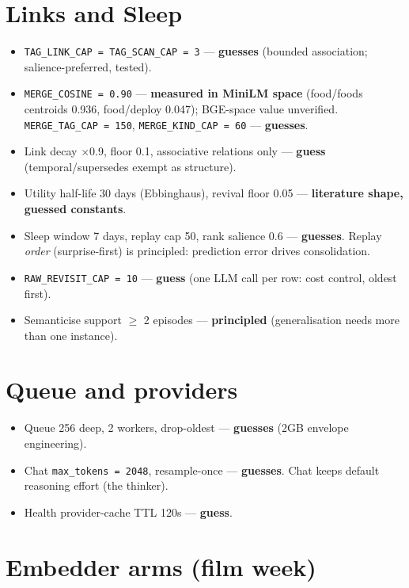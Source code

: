 \section{Links and Sleep}

\begin{itemize}
\item \texttt{TAG\_LINK\_CAP = TAG\_SCAN\_CAP = 3} --- \textbf{guesses}
(bounded association; salience-preferred, tested).
\item \texttt{MERGE\_COSINE = 0.90} --- \textbf{measured in MiniLM
space} (food/foods centroids 0.936, food/deploy 0.047); BGE-space value
unverified. \texttt{MERGE\_TAG\_CAP = 150},
\texttt{MERGE\_KIND\_CAP = 60} --- \textbf{guesses}.
\item Link decay $\times$0.9, floor 0.1, associative relations only
--- \textbf{guess} (temporal/supersedes exempt as structure).
\item Utility half-life 30 days (Ebbinghaus), revival floor 0.05 ---
\textbf{literature shape, guessed constants}.
\item Sleep window 7 days, replay cap 50, rank salience 0.6 ---
\textbf{guesses}. Replay \textit{order} (surprise-first) is principled:
prediction error drives consolidation.
\item \texttt{RAW\_REVISIT\_CAP = 10} --- \textbf{guess} (one LLM call per
row: cost control, oldest first).
\item Semanticise support $\geq$ 2 episodes --- \textbf{principled}
(generalisation needs more than one instance).
\end{itemize}

\section{Queue and providers}

\begin{itemize}
\item Queue 256 deep, 2 workers, drop-oldest --- \textbf{guesses}
(2GB envelope engineering).
\item Chat \texttt{max\_tokens = 2048}, resample-once ---
\textbf{guesses}. Chat keeps default reasoning effort (the thinker).
\item Health provider-cache TTL 120s --- \textbf{guess}.
\end{itemize}

\section{Embedder arms (film week)}

